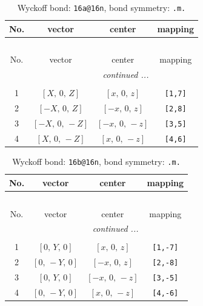 \documentclass[fleqn,8pt]{jsarticle}
\begin{document}
\begin{longtable}{cccc}
\caption{Wyckoff bond: {\tt 16a@16n}, bond symmetry: {\tt .m.}}
 \\
 \hline \hline
No. & vector & center & mapping \\ \hline \endfirsthead

\multicolumn{3}{l}{\tablename\ \thetable{}} \\
 \hline \hline
No. & vector & center & mapping \\ \hline \endhead

 \hline \hline
\multicolumn{3}{r}{\footnotesize\it continued ...} \\ \endfoot

 \hline \hline
\multicolumn{3}{r}{} \\ \endlastfoot

1 & $\left[ X,\, 0,\, Z \right]$ & $\left[ x,\, 0,\, z \right]$ & {\tt [1,7]} \\ \hline
2 & $\left[ - X,\, 0,\, Z \right]$ & $\left[ - x,\, 0,\, z \right]$ & {\tt [2,8]} \\ \hline
3 & $\left[ - X,\, 0,\, - Z \right]$ & $\left[ - x,\, 0,\, - z \right]$ & {\tt [3,5]} \\ \hline
4 & $\left[ X,\, 0,\, - Z \right]$ & $\left[ x,\, 0,\, - z \right]$ & {\tt [4,6]} \\
\end{longtable}
\renewcommand{\arraystretch}{1.2}
\begin{longtable}{cccc}
\caption{Wyckoff bond: {\tt 16b@16n}, bond symmetry: {\tt .m.}}
 \\
 \hline \hline
No. & vector & center & mapping \\ \hline \endfirsthead

\multicolumn{3}{l}{\tablename\ \thetable{}} \\
 \hline \hline
No. & vector & center & mapping \\ \hline \endhead

 \hline \hline
\multicolumn{3}{r}{\footnotesize\it continued ...} \\ \endfoot

 \hline \hline
\multicolumn{3}{r}{} \\ \endlastfoot

1 & $\left[ 0,\, Y,\, 0 \right]$ & $\left[ x,\, 0,\, z \right]$ & {\tt [1,-7]} \\ \hline
2 & $\left[ 0,\, - Y,\, 0 \right]$ & $\left[ - x,\, 0,\, z \right]$ & {\tt [2,-8]} \\ \hline
3 & $\left[ 0,\, Y,\, 0 \right]$ & $\left[ - x,\, 0,\, - z \right]$ & {\tt [3,-5]} \\ \hline
4 & $\left[ 0,\, - Y,\, 0 \right]$ & $\left[ x,\, 0,\, - z \right]$ & {\tt [4,-6]} \\
\end{longtable}
\end{document}
